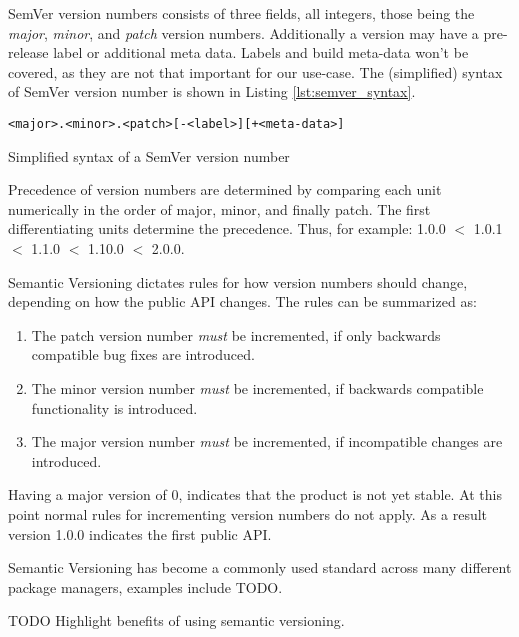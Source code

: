SemVer version numbers consists of three fields, all integers, those being the
\emph{major}, \emph{minor}, and \emph{patch} version numbers. Additionally a
version may have a pre-release label or additional meta data. Labels and build
meta-data won't be covered, as they are not that important for our use-case.
The (simplified) syntax of SemVer version number is shown in Listing
\ref{lst:semver_syntax}.

\begin{listing}[H]
\begin{verbatim}
<major>.<minor>.<patch>[-<label>][+<meta-data>]
\end{verbatim}
\caption{Simplified syntax of a SemVer version number}
\label{lst:semver_syntax}
\end{listing}

Precedence of version numbers are determined by comparing each unit numerically
in the order of major, minor, and finally patch. The first differentiating
units determine the precedence. Thus, for example: 1.0.0 $<$ 1.0.1 $<$ 1.1.0
$<$ 1.10.0 $<$ 2.0.0.

Semantic Versioning dictates rules for how version numbers should change,
depending on how the public API changes. The rules can be summarized as:

\begin{enumerate}

    \item The patch version number \emph{must} be incremented, if only
        backwards compatible bug fixes are introduced.

    \item The minor version number \emph{must} be incremented, if backwards
        compatible functionality is introduced.

    \item The major version number \emph{must} be incremented, if incompatible
        changes are introduced.

\end{enumerate}

Having a major version of 0, indicates that the product is not yet stable. At
this point normal rules for incrementing version numbers do not apply. As a
result version 1.0.0 indicates the first public API.

Semantic Versioning has become a commonly used standard across many different
package managers, examples include TODO.

TODO Highlight benefits of using semantic versioning.

